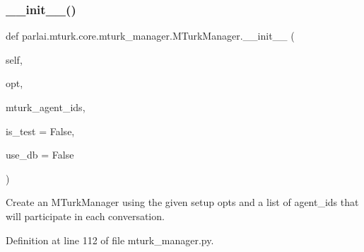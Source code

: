 \subsubsection{\texorpdfstring{\+\_\+\+\_\+init\+\_\+\+\_\+()}{\_\_init\_\_()}}
{\footnotesize\ttfamily def parlai.\+mturk.\+core.\+mturk\+\_\+manager.\+M\+Turk\+Manager.\+\_\+\+\_\+init\+\_\+\+\_\+ (\begin{DoxyParamCaption}\item[{}]{self,  }\item[{}]{opt,  }\item[{}]{mturk\+\_\+agent\+\_\+ids,  }\item[{}]{is\+\_\+test = {\ttfamily False},  }\item[{}]{use\+\_\+db = {\ttfamily False} }\end{DoxyParamCaption})}

\begin{DoxyVerb}Create an MTurkManager using the given setup opts and a list of agent_ids that
will participate in each conversation.
\end{DoxyVerb}
 

Definition at line 112 of file mturk\+\_\+manager.\+py.


